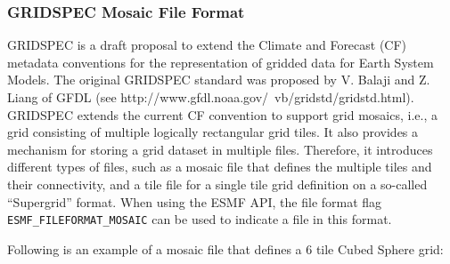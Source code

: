 \subsubsection{GRIDSPEC Mosaic File Format}\label{sec:fileformat:mosaic}

GRIDSPEC is a draft proposal to extend the Climate and Forecast (CF) metadata conventions for the representation of gridded data for Earth System Models.  The original GRIDSPEC standard was proposed by V. Balaji and Z. Liang of GFDL (see  {http://www.gfdl.noaa.gov/~vb/gridstd/gridstd.html}). GRIDSPEC extends the current CF convention to support grid  mosaics, i.e., a grid consisting of multiple logically
rectangular grid tiles. It also provides a mechanism for storing a grid dataset in multiple files.  Therefore,
it introduces different types of files, such as a mosaic file that defines the multiple tiles and their
connectivity, and a tile file for a single tile grid definition on a so-called ``Supergrid'' format. When using the ESMF API, the file format flag {\tt ESMF\_FILEFORMAT\_MOSAIC} can be used to indicate a file in this format.

Following is an example of a mosaic file that defines a 6 tile Cubed Sphere grid:

